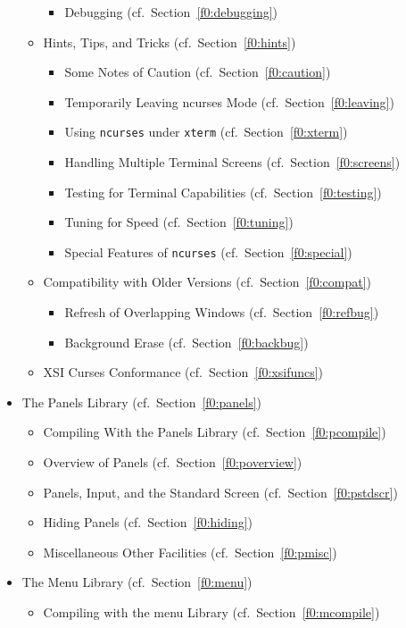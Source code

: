 \begin{itemize}
\begin{itemize}
\begin{itemize}
\item Debugging (cf.\ Section~\ref{f0:debugging})
\end{itemize}
\item Hints, Tips, and Tricks (cf.\ Section~\ref{f0:hints})
\begin{itemize}
\item Some Notes of Caution (cf.\ Section~\ref{f0:caution})
\item Temporarily Leaving ncurses Mode (cf.\ Section~\ref{f0:leaving})
\item Using \texttt{ncurses} under \texttt{xterm} (cf.\ Section~\ref{f0:xterm})
\item Handling Multiple Terminal Screens (cf.\ Section~\ref{f0:screens})
\item Testing for Terminal Capabilities (cf.\ Section~\ref{f0:testing})
\item Tuning for Speed (cf.\ Section~\ref{f0:tuning})
\item Special Features of \texttt{ncurses} (cf.\ Section~\ref{f0:special})
\end{itemize}
\item Compatibility with Older Versions (cf.\ Section~\ref{f0:compat})
\begin{itemize}
\item Refresh of Overlapping Windows (cf.\ Section~\ref{f0:refbug})
\item Background Erase (cf.\ Section~\ref{f0:backbug})
\end{itemize}
\item XSI Curses Conformance (cf.\ Section~\ref{f0:xsifuncs})
\end{itemize}
\item The Panels Library (cf.\ Section~\ref{f0:panels})
\begin{itemize}
\item Compiling With the Panels Library (cf.\ Section~\ref{f0:pcompile})
\item Overview of Panels (cf.\ Section~\ref{f0:poverview})
\item Panels, Input, and the Standard Screen (cf.\ Section~\ref{f0:pstdscr})
\item Hiding Panels (cf.\ Section~\ref{f0:hiding})
\item Miscellaneous Other Facilities (cf.\ Section~\ref{f0:pmisc})
\end{itemize}
\item The Menu Library (cf.\ Section~\ref{f0:menu})
\begin{itemize}
\item Compiling with the menu Library (cf.\ Section~\ref{f0:mcompile})

\end{itemize}
\end{itemize}
